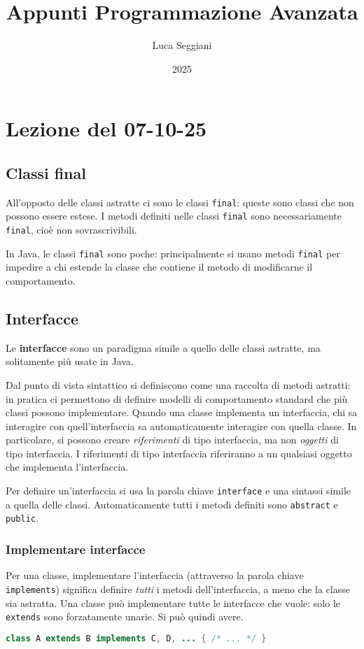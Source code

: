 \documentclass[a4paper,11pt]{article}
\title{Appunti Programmazione Avanzata}
\author{Luca Seggiani}
\date{2025}
\begin{document}
\section{Lezione del 07-10-25}

\thispagestyle{empty}
\pagestyle{fancy}

\subsection{Classi final}
All'opposto delle classi astratte ci sono le classi \lstinline|final|: queste sono classi che non possono essere estese.
I metodi definiti nelle classi \lstinline|final| sono necessariamente \lstinline|final|, cioè non sovrascrivibili.

In Java, le classi \lstinline|final| sono poche: principalmente si usano metodi \lstinline|final| per impedire a chi estende la classe che contiene il metodo di modificarne il comportamento.

\subsection{Interfacce}
Le \textbf{interfacce} sono un paradigma simile a quello delle classi astratte, ma solitamente più usate in Java.

Dal punto di vista sintattico si definiscono come una raccolta di metodi astratti: in pratica ci permettono di definire modelli di comportamento standard che più classi possono implementare.
Quando una classe implementa un interfaccia, chi sa interagire con quell'interfaccia sa automaticamente interagire con quella classe. 
In particolare, si possono creare \textit{riferimenti} di tipo interfaccia, ma non \textit{oggetti} di tipo interfaccia.
I riferimenti di tipo interfaccia riferiranno a un qualsiasi oggetto che implementa l'interfaccia. 

Per definire un'interfaccia si usa la parola chiave \lstinline|interface| e una sintassi simile a quella delle classi.
Automaticamente tutti i metodi definiti sono \lstinline|abstract| e \lstinline|public|.

\subsubsection{Implementare interfacce}
Per una classe, implementare l'interfaccia (attraverso la parola chiave \lstinline|implements|) significa definire \textit{tutti} i metodi dell'interfaccia, a meno che la classe sia astratta.
Una classe può implementare tutte le interfacce che vuole: solo le \lstinline|extends| sono forzatamente unarie. Si può quindi avere.
\begin{lstlisting}[language=java, style=codestyle]	
class A extends B implements C, D, ... { /* ... */ }
\end{lstlisting}
\end{document}
